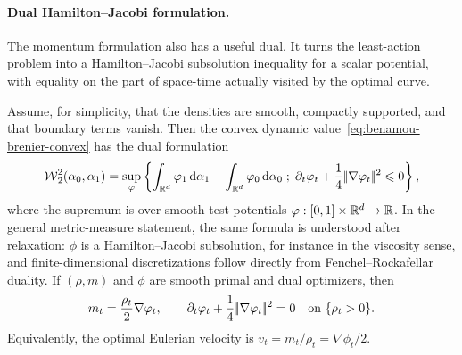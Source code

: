\paragraph{Dual Hamilton--Jacobi formulation.}
The momentum formulation also has a useful dual. It turns the least-action problem into a Hamilton--Jacobi subsolution inequality for a scalar potential, with equality on the part of space-time actually visited by the optimal curve.

\begin{prop}\label{prop-benamou-brenier-dual}
Assume, for simplicity, that the densities are smooth, compactly supported, and that boundary terms vanish. Then the convex dynamic value~\eqref{eq:benamou-brenier-convex} has the dual formulation
\begin{equation}\label{eq:benamou-brenier-dual}
\operatorname{\mathcal{W}}_2^2(\alpha_0,\alpha_1)
=
\sup_{\varphi}
\left\{ 
\int_{\mathbb{R}^d}\varphi_1\,\mathrm{d}\alpha_1
-
\int_{\mathbb{R}^d}\varphi_0\,\mathrm{d}\alpha_0
 \;;\; 
\partial_t\varphi_t+\frac14|\!| \nabla\varphi_t |\!|^2\leqslant 0
 \right\},
\end{equation}
where the supremum is over smooth test potentials $\varphi:[0,1]\times\mathbb{R}^d\to\mathbb{R}$. In the general metric-measure statement, the same formula is understood after relaxation: $\phi$ is a Hamilton--Jacobi subsolution, for instance in the viscosity sense, and finite-dimensional discretizations follow directly from Fenchel--Rockafellar duality.
If $(\rho,m)$ and $\phi$ are smooth primal and dual optimizers, then
\begin{equation}\label{eq:bb-primal-dual-relation}
m_t=\frac{\rho_t}{2}\nabla\varphi_t,
\qquad
\partial_t\varphi_t+\frac14|\!| \nabla\varphi_t |\!|^2=0
\quad\text{on }\{\rho_t>0\}.
\end{equation}
Equivalently, the optimal Eulerian velocity is $v_t=m_t/\rho_t=\nabla\phi_t/2$.
\end{prop}
